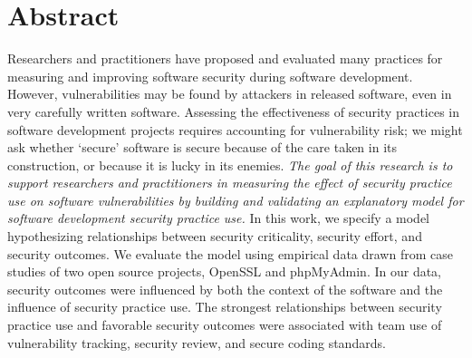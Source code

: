 \section{Abstract}
\label{sec:abstract}
Researchers and practitioners have proposed and evaluated many practices for measuring and improving software security during software development. However, vulnerabilities may be found by attackers in released software, even in very carefully written software. Assessing the effectiveness of security practices in software development projects requires accounting for vulnerability risk; we might ask whether `secure' software is secure because of the care taken in its construction, or because it is lucky in its enemies. \textit{The goal of this research is to support researchers and practitioners in measuring the effect of security practice use on software vulnerabilities by building and validating an explanatory model for software development security practice use.} In this work, we specify a model hypothesizing relationships between security criticality, security effort, and security outcomes.  We evaluate the model using empirical data drawn from case studies of two open source projects, OpenSSL and phpMyAdmin. In our data, security outcomes were influenced by both the context of the software and the influence of security practice use. The strongest relationships between security practice use and favorable security outcomes were associated with team use of vulnerability tracking, security review, and secure coding standards. 